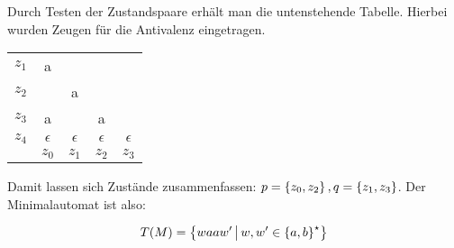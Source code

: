 Durch Testen der Zustandspaare erhält man die untenstehende Tabelle. Hierbei wurden Zeugen für die Antivalenz eingetragen.

\begin{tabular}{ccccc}
	\cline{2-2}
	$z_1$ & 	\multicolumn{1}{|c|}{a}		&				&				&			 \\
	\cline{2-3}
	$z_2$ & 	\multicolumn{1}{|c|}{ }		&		\multicolumn{1}{|c|}{a}		&				&			 \\
	\cline{2-4}
	$z_3$ & 	\multicolumn{1}{|c|}{a}		&		\multicolumn{1}{|c|}{ }		&		\multicolumn{1}{|c|}{a}		&			 \\
	\cline{2-5}
	$z_4$ & 	\multicolumn{1}{|c|}{$\epsilon$}		&		\multicolumn{1}{|c|}{$\epsilon$}		&		\multicolumn{1}{|c|}{$\epsilon$}		&		\multicolumn{1}{|c|}{$\epsilon$}	 \\
	\cline{2-5}
				& $z_0$ & $z_1$ & $z_2$ & $z_3$\\
\end{tabular}

Damit lassen sich Zustände zusammenfassen: $p=\left\{ z_0,z_2 \right\}, q=\left\{ z_1,z_3 \right\}$. Der Minimalautomat ist also:

\vspace{1em}

\begin{equation*}
	T(M)=\left\{ waaw' \,\middle|\, w,w'\in\left\{ a,b \right\}^\star \right\}
\end{equation*}
